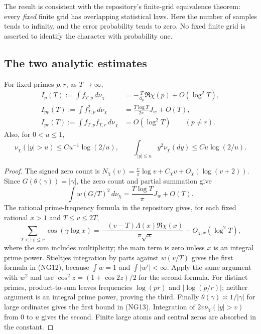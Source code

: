 The result is consistent with the repository's finite-grid equivalence
theorem: every \emph{fixed} finite grid has overlapping statistical laws.
Here the number of samples tends to infinity, and the error probability
tends to zero.  No fixed finite grid is asserted to identify the character
with probability one.

\subsection{The two analytic estimates}

\begin{lemma}
\label{lem:weighted-moments}
For fixed primes $p,r$, as $T\to\infty$,
\begin{align*}
 I_p(T):=\int f_{T,p}\,d\nu_\chi
   &=-\frac{T}{a_p}\Re\chi(p)+O(\log^2T),\\
 I_{pp}(T):=\int f_{T,p}^2\,d\nu_\chi
   &=\frac{T\log T}{2\pi}J_w+O(T),\\
 I_{pr}(T):=\int f_{T,p}f_{T,r}\,d\nu_\chi
   &=O(\log^2T)\qquad(p\ne r).                            \tag{NG12}
\end{align*}
Also, for $0<u\le1$,
\[
 \nu_\chi(|y|>u)\le C u^{-1}\log(2/u),\qquad
 \int_{|y|\le u}y^2\nu_\chi(dy)\le C u\log(2/u).           \tag{NG13}
\]
\end{lemma}

\begin{proof}
The signed zero count is
$N_\chi(v)=\frac v\pi\log v+C_\chi v+O_\chi(\log(v+2))$.
Since $G(\theta(\gamma))=|\gamma|$, the zero count and partial summation
give
\[
 \int w(G/T)^2\,d\nu_\chi
       =\frac{T\log T}\pi J_w+O(T).
\]
The rational prime-frequency formula in the repository gives, for each
fixed rational $x>1$ and $T\le v\le2T$,
\[
 \sum_{T<|\gamma|\le v}\cos(\gamma\log x)
 =-\frac{(v-T)\Lambda(x)\Re\chi(x)}{\pi\sqrt x}
       +O_{\chi,x}(\log^2T),                              \tag{NG14}
\]
where the sum includes multiplicity; the main term is zero unless $x$ is
an integral prime power.  Stieltjes integration by parts against $w(v/T)$
gives the first formula in (NG12), because $\int w=1$ and
$\int|w'|<\infty$.  Apply the same argument with $w^2$ and use
$\cos^2 z=(1+\cos2z)/2$ for the second formula.
For distinct primes, product-to-sum leaves frequencies $\log(pr)$ and
$|\log(p/r)|$; neither argument is an integral prime power, proving the
third.  Finally $\theta(\gamma)\asymp1/|\gamma|$ for large ordinates gives
the first bound in (NG13).  Integration of $2v\nu_\chi(|y|>v)$ from $0$
to $u$ gives the second.  Finite large atoms and central zeros are absorbed
in the constant.
\end{proof}

